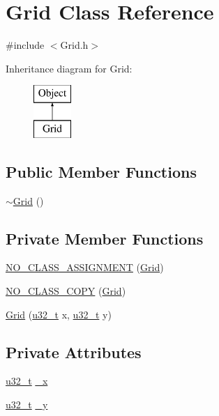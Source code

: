 \section{Grid Class Reference}
\label{class_grid}


{\ttfamily \#include $<$Grid.\-h$>$}

Inheritance diagram for Grid\-:\begin{figure}[H]
\begin{center}
\leavevmode
\includegraphics[height=2.000000cm]{class_grid}
\end{center}
\end{figure}
\subsection*{Public Member Functions}
\begin{DoxyCompactItemize}
\item 
\hyperlink{class_grid_a3661d0a7f998caaaf8627d7a67072116}{$\sim$\-Grid} ()
\end{DoxyCompactItemize}
\subsection*{Private Member Functions}
\begin{DoxyCompactItemize}
\item 
\hyperlink{class_grid_af0cd213a5e3346545486cb0d5b9adabc}{N\-O\-\_\-\-C\-L\-A\-S\-S\-\_\-\-A\-S\-S\-I\-G\-N\-M\-E\-N\-T} (\hyperlink{class_grid}{Grid})
\item 
\hyperlink{class_grid_aa8e34f41a5b31907483b89f16fe9c098}{N\-O\-\_\-\-C\-L\-A\-S\-S\-\_\-\-C\-O\-P\-Y} (\hyperlink{class_grid}{Grid})
\item 
\hyperlink{class_grid_a72099a3258586ec6ce61e1cde837989f}{Grid} (\hyperlink{types_8h_a0c0a490ab7fa397be6c764a935cc5ea4}{u32\-\_\-t} x, \hyperlink{types_8h_a0c0a490ab7fa397be6c764a935cc5ea4}{u32\-\_\-t} y)
\end{DoxyCompactItemize}
\subsection*{Private Attributes}
\begin{DoxyCompactItemize}
\item 
\hyperlink{types_8h_a0c0a490ab7fa397be6c764a935cc5ea4}{u32\-\_\-t} \hyperlink{class_grid_a0de783a906bc60749538bbfcb5e21eec}{\-\_\-x}
\item 
\hyperlink{types_8h_a0c0a490ab7fa397be6c764a935cc5ea4}{u32\-\_\-t} \hyperlink{class_grid_ab3eb4febe35bece4a81df8bc99140583}{\-\_\-y}
\end{DoxyCompactItemize}
